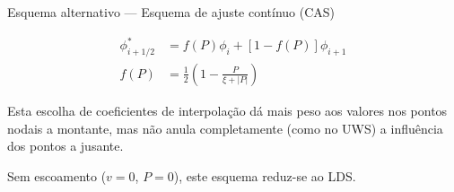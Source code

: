 \documentclass[final,t]{beamer}
\begin{document}
\begin{frame}{}
\begin{columns}[t]
\begin{column}{\linewidth}
\begin{exampleblock}{Esquema alternativo --- Esquema de ajuste contínuo
    (CAS)}
    \begin{minipage}[c]{0.25\linewidth}
        \begin{align*}
            \phi^*_{i+1/2} &= f(P)\phi_i + [1-f(P)]\phi_{i+1}\\[5mm]
            f(P) &= \frac{1}{2}\left(1-\frac{P}{\xi+|P|}\right)
        \end{align*}
    \end{minipage}\hfill
    \hfill
    \begin{minipage}[c]{0.4\linewidth}
        Esta escolha de coeficientes de interpolação dá mais peso aos valores
        nos pontos nodais a montante, mas não anula completamente (como no UWS)
        a influência dos pontos a jusante.

        Sem escoamento ($v=0$, $P=0$), este esquema reduz-se ao LDS.
    \end{minipage}
\end{exampleblock}


\end{column}
\end{columns}
\end{frame}
\end{document}
